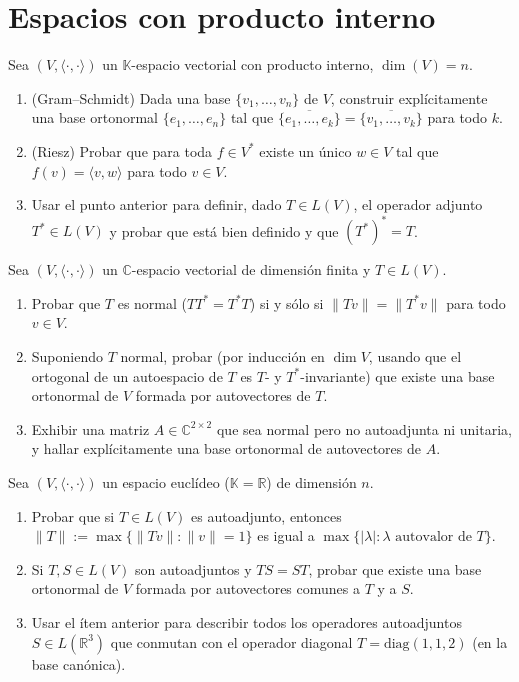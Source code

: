 \documentclass{article}
\newcommand{\R}{\mathbb{R}}
\newcommand{\C}{\mathbb{C}}
\newcommand{\K}{\mathbb{K}}
\DeclareMathOperator{\dimm}{dim}
\newcommand{\gen}[1]{\overline{\{#1\}}}          %
\theoremstyle{plain}
\theoremstyle{definition}
\theoremstyle{remark}
\newenvironment{ejercicio}[1]{\begin{trivlist}
\item[\hskip \labelsep {\bfseries Ejercicio}\hskip \labelsep {\bfseries #1.}]}{\end{trivlist}}
\begin{document}
\section{Espacios con producto interno}

\begin{ejercicio}{16}
    Sea \((V, \langle \cdot,\cdot\rangle)\) un \(\K\)-espacio vectorial con producto interno, \(\dimm(V) = n\).
    \begin{enumerate}
        \item (Gram--Schmidt) Dada una base \(\{v_1,\ldots,v_n\}\) de \(V\), construir explícitamente una base ortonormal \(\{e_1,\ldots,e_n\}\) tal que \(\gen{e_1,\ldots,e_k} = \gen{v_1,\ldots,v_k}\) para todo \(k\).
        \item (Riesz) Probar que para toda \(f \in V^*\) existe un único \(w \in V\) tal que \(f(v) = \langle v, w\rangle\) para todo \(v \in V\).
        \item Usar el punto anterior para definir, dado \(T \in L(V)\), el operador adjunto \(T^* \in L(V)\) y probar que está bien definido y que \((T^*)^* = T\).
    \end{enumerate}
\end{ejercicio}

\begin{ejercicio}{17}
    Sea \((V,\langle\cdot,\cdot\rangle)\) un \(\C\)-espacio vectorial de dimensión finita y \(T \in L(V)\).
    \begin{enumerate}
        \item Probar que \(T\) es normal (\(TT^*=T^*T\)) si y sólo si \(\|Tv\| = \|T^*v\|\) para todo \(v \in V\).
        \item Suponiendo \(T\) normal, probar (por inducción en \(\dimm V\), usando que el ortogonal de un autoespacio de \(T\) es \(T\)- y \(T^*\)-invariante) que existe una base ortonormal de \(V\) formada por autovectores de \(T\).
        \item Exhibir una matriz \(A \in \C^{2\times 2}\) que sea normal pero no autoadjunta ni unitaria, y hallar explícitamente una base ortonormal de autovectores de \(A\).
    \end{enumerate}
\end{ejercicio}

\begin{ejercicio}{18}
    Sea \((V,\langle\cdot,\cdot\rangle)\) un espacio euclídeo (\(\K=\R\)) de dimensión \(n\).
    \begin{enumerate}
        \item Probar que si \(T \in L(V)\) es autoadjunto, entonces \(\|T\| := \max\{\|Tv\| : \|v\|=1\}\) es igual a \(\max\{|\lambda| : \lambda \text{ autovalor de } T\}\).
        \item Si \(T, S \in L(V)\) son autoadjuntos y \(TS=ST\), probar que existe una base ortonormal de \(V\) formada por autovectores comunes a \(T\) y a \(S\).
        \item Usar el ítem anterior para describir todos los operadores autoadjuntos \(S \in L(\R^3)\) que conmutan con el operador diagonal \(T = \mathrm{diag}(1,1,2)\) (en la base canónica).
    \end{enumerate}
\end{ejercicio}
\end{document}
